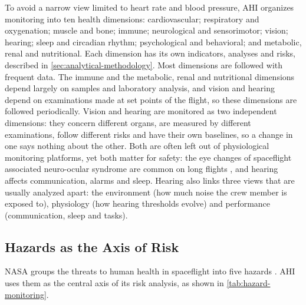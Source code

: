 To avoid a narrow view limited to heart rate and blood pressure, AHI organizes monitoring into ten health dimensions: cardiovascular; respiratory and oxygenation; muscle and bone; immune; neurological and sensorimotor; vision; hearing; sleep and circadian rhythm; psychological and behavioral; and metabolic, renal and nutritional. Each dimension has its own indicators, analyses and risks, described in \ref{sec:analytical-methodology}. Most dimensions are followed with frequent data. The immune and the metabolic, renal and nutritional dimensions depend largely on samples and laboratory analysis, and vision and hearing depend on examinations made at set points of the flight, so these dimensions are followed periodically. Vision and hearing are monitored as two independent dimensions: they concern different organs, are measured by different examinations, follow different risks and have their own baselines, so a change in one says nothing about the other. Both are often left out of physiological monitoring platforms, yet both matter for safety: the eye changes of spaceflight associated neuro-ocular syndrome are common on long flights \cite{nasa_hrr_sans}, and hearing affects communication, alarms and sleep. Hearing also links three views that are usually analyzed apart: the environment (how much noise the crew member is exposed to), physiology (how hearing thresholds evolve) and performance (communication, sleep and tasks).

\subsection{Hazards as the Axis of Risk}
\label{subsec:hazard-axis}

NASA groups the threats to human health in spaceflight into five hazards \cite{nasa_hrp_five_hazards}. AHI uses them as the central axis of its risk analysis, as shown in \ref{tab:hazard-monitoring}.

